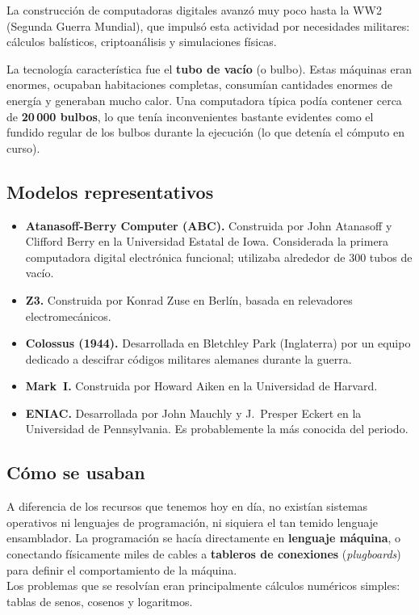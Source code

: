 \documentclass[10pt,letterpaper,twocolumn]{article}
\begin{document}
La construcción de computadoras digitales avanzó muy poco
hasta la WW2 (Segunda Guerra Mundial), que impulsó esta actividad por
necesidades militares: cálculos balísticos, criptoanálisis y simulaciones
físicas.

La tecnología característica fue el \textbf{tubo de vacío} (o bulbo).
Estas máquinas eran enormes, ocupaban habitaciones completas, consumían
cantidades enormes de energía y generaban mucho calor.
Una computadora típica podía contener cerca de \textbf{20{\,}000 bulbos},
lo que tenía inconvenientes bastante evidentes como el fundido regular de los 
bulbos durante la ejecución (lo que detenía el cómputo en curso).

\subsection{Modelos representativos}

\begin{itemize}[leftmargin=*,itemsep=0.2em]
  \item \textbf{Atanasoff-Berry Computer (ABC).} Construida por John
    Atanasoff y Clifford Berry en la Universidad Estatal de Iowa.
    Considerada la primera computadora digital electrónica funcional;
    utilizaba alrededor de 300 tubos de vacío.
  \item \textbf{Z3.} Construida por Konrad Zuse en Berlín, basada en
    relevadores electromecánicos.
  \item \textbf{Colossus (1944).} Desarrollada en Bletchley Park
    (Inglaterra) por un equipo dedicado a descifrar códigos militares
    alemanes durante la guerra.
  \item \textbf{Mark~I.} Construida por Howard Aiken en la Universidad
    de Harvard.
  \item \textbf{ENIAC.} Desarrollada por John Mauchly y J.~Presper
    Eckert en la Universidad de Pennsylvania. Es probablemente la más
    conocida del periodo.
\end{itemize}

\subsection{Cómo se usaban}

A diferencia de los recursos que tenemos hoy en día, no existían sistemas 
operativos ni lenguajes de programación, ni siquiera el tan temido lenguaje 
ensamblador. La programación se hacía directamente en \textbf{lenguaje máquina},
 o conectando físicamente miles de cables a \textbf{tableros de conexiones} 
 (\emph{plugboards}) para definir el comportamiento de la máquina. \\
Los problemas que se resolvían eran principalmente cálculos numéricos simples: 
tablas de senos, cosenos y logaritmos.
\end{document}
